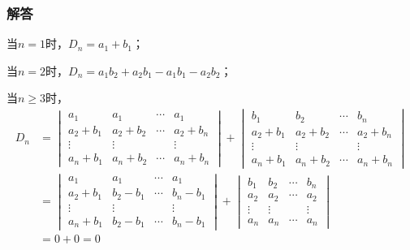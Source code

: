 \documentclass[10pt,xcolor=svgnames]{beamer} %
\begin{document}
\begin{frame}
    \frametitle{解答}
    当\(n=1\)时，\(D_n=a_1+b_1\)；

    当\(n=2\)时，\(D_n=a_1b_2+a_2b_1-a_1b_1-a_2b_2\)；
    \pause

    当\(n\geq3\)时，
    \begin{align*}
        D_n & =
        \begin{vmatrix}
            a_{1}       & a_{1}       & \cdots & a_{1}       \\
            a_{2}+b_{1} & a_{2}+b_{2} & \cdots & a_{2}+b_{n} \\
            \vdots      & \vdots      &        & \vdots      \\
            a_{n}+b_{1} & a_{n}+b_{2} & \cdots & a_{n}+b_{n}
        \end{vmatrix}+
        \begin{vmatrix}
            b_{1}       & b_{2}       & \cdots & b_{n}       \\
            a_{2}+b_{1} & a_{2}+b_{2} & \cdots & a_{2}+b_{n} \\
            \vdots      & \vdots      &        & \vdots      \\
            a_{n}+b_{1} & a_{n}+b_{2} & \cdots & a_{n}+b_{n}
        \end{vmatrix} \\
            & =
        \begin{vmatrix}
            a_{1}       & a_{1}       & \cdots & a_{1}       \\
            a_{2}+b_{1} & b_{2}-b_{1} & \cdots & b_{n}-b_{1} \\
            \vdots      & \vdots      &        & \vdots      \\
            a_{n}+b_{1} & b_{2}-b_{1} & \cdots & b_{n}-b_{1}
        \end{vmatrix}+
        \begin{vmatrix}
            b_{1}  & b_{2}  & \cdots & b_{n}  \\
            a_{2}  & a_{2}  & \cdots & a_{2}  \\
            \vdots & \vdots &        & \vdots \\
            a_{n}  & a_{n}  & \cdots & a_{n}
        \end{vmatrix}                \\
            & =0+0=0
    \end{align*}
\end{frame}
\end{document}

